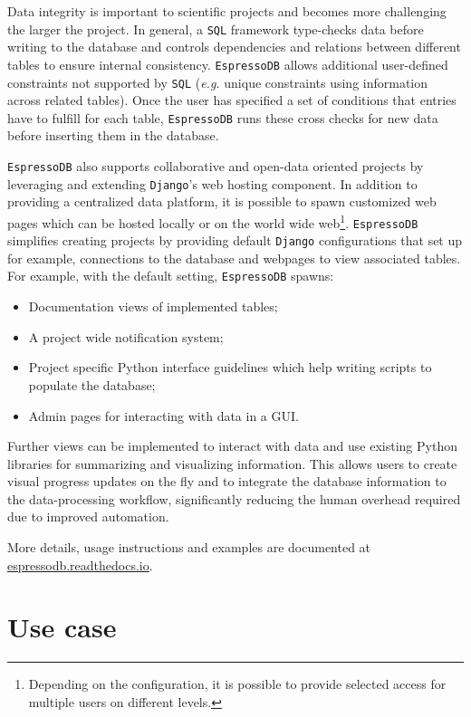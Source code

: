 Data integrity is important to scientific projects and becomes more
challenging the larger the project. In general, a \texttt{SQL} framework
type-checks data before writing to the database and controls
dependencies and relations between different tables to ensure internal
consistency. \texttt{EspressoDB} allows additional user-defined
constraints not supported by \texttt{SQL} (\emph{e.g.} unique
constraints using information across related tables). Once the user has
specified a set of conditions that entries have to fulfill for each
table, \texttt{EspressoDB} runs these cross checks for new data before
inserting them in the database.

\texttt{EspressoDB} also supports collaborative and open-data oriented
projects by leveraging and extending \texttt{Django}'s web hosting
component. In addition to providing a centralized data platform, it is
possible to spawn customized web pages which can be hosted locally or on
the world wide web\footnote{Depending on the configuration, it is
  possible to provide selected access for multiple users on different
  levels.}. \texttt{EspressoDB} simplifies creating projects by
providing default \texttt{Django} configurations that set up for
example, connections to the database and webpages to view associated
tables. For example, with the default setting, \texttt{EspressoDB}
spawns:

\begin{itemize}
\tightlist
\item
  Documentation views of implemented tables;
\item
  A project wide notification system;
\item
  Project specific Python interface guidelines which help writing
  scripts to populate the database;
\item
  Admin pages for interacting with data in a GUI.
\end{itemize}

Further views can be implemented to interact with data and use existing
Python libraries for summarizing and visualizing information. This
allows users to create visual progress updates on the fly and to
integrate the database information to the data-processing workflow,
significantly reducing the human overhead required due to improved
automation.

More details, usage instructions and examples are documented at
\href{https://espressodb.readthedocs.io}{espressodb.readthedocs.io}.

\hypertarget{use-case}{%
\section{Use case}\label{use-case}}

